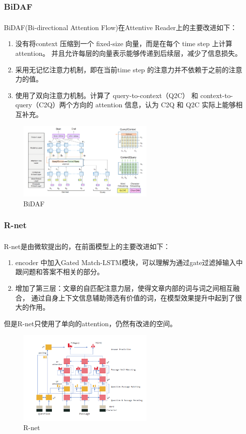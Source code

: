 \documentclass[10pt, a4]{extarticle}
\newcommand{\upcite}[1]{\textsuperscript{\textsuperscript{\cite{#1}}}}
\begin{document}
\subsubsection{BiDAF}
BiDAF(Bi-directional Attention Flow)\upcite{bidaf}在Attentive Reader上的主要改进如下：
\begin{enumerate}
	\item 没有将context 压缩到一个 fixed-size 向量，而是在每个 time step 上计算 attention。 并且允许每层的向量表示能够传递到后续层，减少了信息损失。
	\item 采用无记忆注意力机制，即在当前time step 的注意力并不依赖于之前的注意力的值。
	\item 使用了双向注意力机制。计算了 query-to-context（Q2C） 和 context-to-query（C2Q）两个方向的 attention 信息，认为 C2Q 和 Q2C 实际上能够相互补充。
\end{enumerate}
\begin{figure}[H]
	\centering
	\includegraphics[width=0.6\textwidth]{figure/bidaf.png}
	\caption{BiDAF}
	\label{bidaf}
\end{figure}

\subsubsection{R-net}
R-net\upcite{rnet}是由微软提出的，在前面模型上的主要改进如下：
\begin{enumerate}
	\item encoder 中加入Gated Match-LSTM模块，可以理解为通过gate过滤掉输入中跟问题和答案不相关的部分。
	\item 增加了第三层：文章的自匹配注意力层，使得文章内部的词与词之间相互融合， 通过自身上下文信息辅助筛选有价值的词，在模型效果提升中起到了很大的作用。
\end{enumerate}
但是R-net只使用了单向的attention，仍然有改进的空间。

\begin{figure}[H]
	\centering
	\includegraphics[width=0.6\textwidth]{figure/rnet.png}
	\caption{R-net}
	\label{rnet}
\end{figure}
\end{document}
